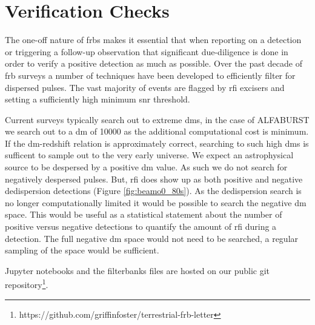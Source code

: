 \documentclass[a4paper,fleqn,usenatbib]{mnras}
\begin{document}
\section{Verification Checks}

The one-off nature of \glspl{frb} makes it essential that when reporting on a
detection or triggering a follow-up observation that significant due-diligence
is done in order to verify a positive detection as much as possible. Over the
past decade of \gls{frb} surveys a number of techniques have been developed to
efficiently filter for dispersed pulses. The vast majority of events are flagged
by \gls{rfi} excisers and setting a sufficiently high minimum \gls{snr}
threshold. 


Current surveys typically search out to extreme \glspl{dm}, in the case of
ALFABURST we search out to a \gls{dm} of 10000 as the additional computational
cost is minimum. If the \gls{dm}-redshift relation is approximately correct,
searching to such high \glspl{dm} is sufficent to sample out to the very early
universe. We expect an astrophysical source to be despersed by a positive
\gls{dm} value. As such we do not search for negatively despersed pulses. But,
\gls{rfi} does show up as both positive and negative dedispersion detections
(Figure \ref{fig:beamo0_80s}). As the dedispersion search is no longer
computationally limited it would be possible to search the negative \gls{dm}
space. This would be useful as a statistical statement about the number of
positive versus negative detections to quantify the amount of \gls{rfi} during a
detection. The full negative \gls{dm} space would not need to be searched, a
regular sampling of the space would be sufficient.





Jupyter notebooks and the filterbanks files are hosted on our
public git
repository\footnote{https://github.com/griffinfoster/terrestrial-frb-letter}.


 

\bsp	%
\label{lastpage}
\end{document}
